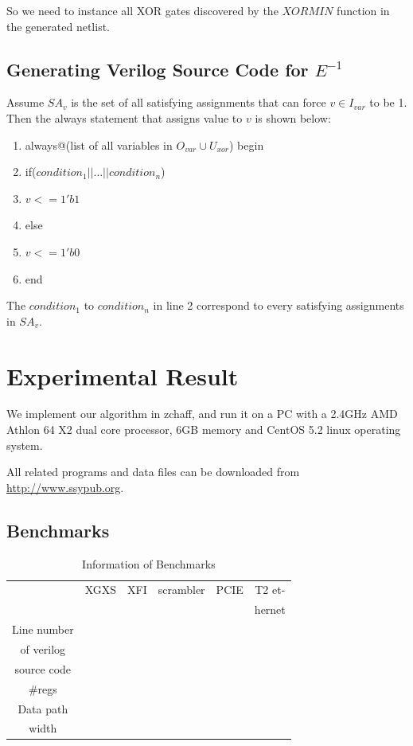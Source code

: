 \documentclass[journal]{IEEEtran}
\begin{document}
So we need to instance all XOR gates discovered by the $XORMIN$ function in the generated netlist.

\subsection{Generating Verilog Source Code for $E^{-1}$}
Assume $SA_v$ is the set of all satisfying assignments that can force $v\in I_{var}$ to be 1.
Then the always statement that assigns value to $v$ is shown below:
\begin{enumerate}
\item always@(list of all variables in $O_{var}\cup U_{xor}$) begin
\item \hspace{0.3cm}if($condition_1 || \dots || condition_n$)
\item \hspace{0.6cm} $v<=1'b1$
\item \hspace{0.3cm}else
\item \hspace{0.6cm} $v<=1'b0$
\item end
\end{enumerate}

The $condition_1$ to $condition_n$ in line 2 correspond to every satisfying assignments in $SA_v$.

\section{Experimental Result}\label{sec_exp}
We implement our algorithm in zchaff\cite{CHAFF},
and run it on a PC with a 2.4GHz AMD Athlon 64 X2 dual core processor, 6GB memory and CentOS 5.2 linux operating system.

All related programs and data files can be downloaded from \url{http://www.ssypub.org}.
\subsection{Benchmarks}
\begin{table}[!t]
\centering
\caption{Information of Benchmarks}
\begin{tabular}{|c|c|c|c|c|c|}
\hline
&XGXS&XFI&scrambler&PCIE&T2 et-\\
&&&&&hernet\\\hline
Line number&&&&&\\
of verilog&&&&&\\
source code&&&&&\\\hline
\#regs&&&&&\\\hline
Data path&&&&&\\
width&&&&&\\ \hline
\end{tabular}
\end{table}
\end{document}
